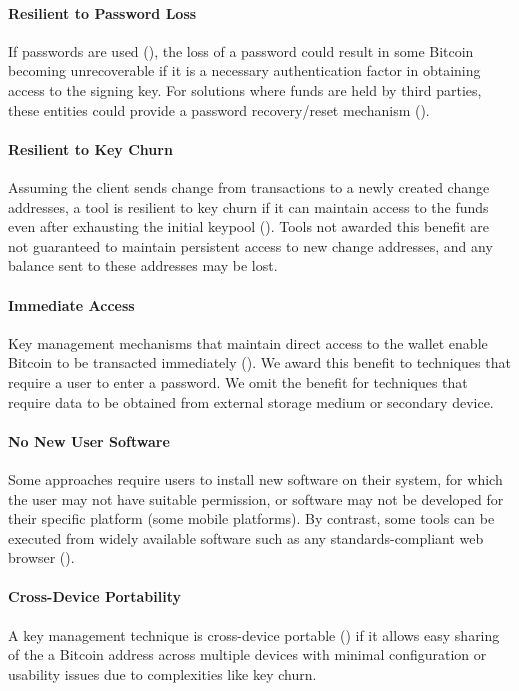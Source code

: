 \paragraph{Resilient to Password Loss}
\label{Resilient to Password Loss}
If passwords are used (\prt), the loss of a password could result in some Bitcoin becoming unrecoverable if it is a necessary authentication factor in obtaining access to the signing key. For solutions where funds are held by third parties, these entities could provide a password recovery/reset mechanism (\full).

\paragraph{Resilient to Key Churn}
\label{Compatible with Change Keys}
Assuming the client sends change from transactions to a newly created change addresses, a tool is resilient to key churn if it can maintain access to the funds even after exhausting the initial keypool (\full). Tools not awarded this benefit are not guaranteed to maintain persistent access to new change addresses, and any balance sent to these addresses may be lost.

\paragraph{Immediate Access}
\label{Immediate Access}
Key management mechanisms that maintain direct access to the wallet enable Bitcoin to be transacted immediately (\full). We award this benefit to techniques that require a user to enter a password. We omit the benefit for techniques that require data to be obtained from external storage medium or secondary device. 

\paragraph{No New User Software}
\label{No New Software}
Some approaches require users to install new software on their system, for which the user may not have suitable permission, or software may not be developed for their specific platform (\eg some mobile platforms). By contrast, some tools can be executed from widely available software such as any standards-compliant web browser (\full). 

\paragraph{Cross-Device Portability}
\label{Portable}
A key management technique is cross-device portable (\full) if it allows easy sharing of the a Bitcoin address across multiple devices with minimal configuration or usability issues due to complexities like key churn.

